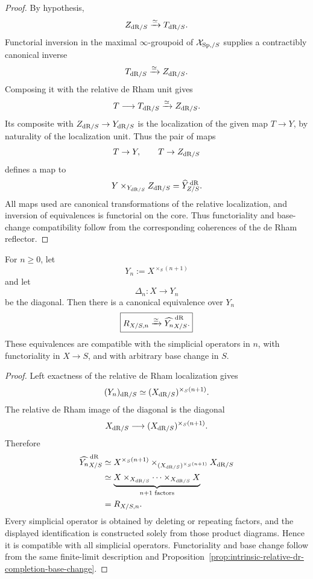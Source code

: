 \begin{proof}
By hypothesis,
\[
    Z_{\mathrm{dR}/S}\xrightarrow{\simeq}T_{\mathrm{dR}/S}.
\]
Functorial inversion in the maximal \(\infty\)-groupoid of
\(\mathcal X_{\mathrm{Sp},/S}\) supplies a contractibly canonical inverse
\[
    T_{\mathrm{dR}/S}\xrightarrow{\simeq}Z_{\mathrm{dR}/S}.
\]
Composing it with the relative de Rham unit gives
\[
    T\longrightarrow T_{\mathrm{dR}/S}
    \xrightarrow{\simeq}
    Z_{\mathrm{dR}/S}.
\]
Its composite with \(Z_{\mathrm{dR}/S}\to Y_{\mathrm{dR}/S}\) is the localization of the given map
\(T\to Y\), by naturality of the localization unit.  Thus the pair of maps
\[
    T\to Y,
    \qquad
    T\to Z_{\mathrm{dR}/S}
\]
defines a map to
\[
    Y\times_{Y_{\mathrm{dR}/S}}Z_{\mathrm{dR}/S}
    =
    \widehat Y^{\,\mathrm{dR}}_{Z/S}.
\]
All maps used are canonical transformations of the relative localization, and inversion of
equivalences is functorial on the core.  Thus functoriality and base-change compatibility follow from
the corresponding coherences of the de Rham reflector.
\end{proof}

\begin{theorem}
\label{thm:relation-simplices-as-completions}
For \(n\geq0\), let
\[
    Y_n:=X^{\times_S(n+1)}
\]
and let
\[
    \Delta_n:X\longrightarrow Y_n
\]
be the diagonal.  Then there is a canonical equivalence over \(Y_n\)
\[
\boxed{
    R_{X/S,n}
    \xrightarrow{\simeq}
    \widehat{Y_n}^{\,\mathrm{dR}}_{X/S}.
}
\]
These equivalences are compatible with the simplicial operators in \(n\), with functoriality in
\(X\to S\), and with arbitrary base change in \(S\).
\end{theorem}

\begin{proof}
Left exactness of the relative de Rham localization gives
\[
    (Y_n)_{\mathrm{dR}/S}
    \simeq
    (X_{\mathrm{dR}/S})^{\times_S(n+1)}.
\]
The relative de Rham image of the diagonal is the diagonal
\[
    X_{\mathrm{dR}/S}
    \longrightarrow
    (X_{\mathrm{dR}/S})^{\times_S(n+1)}.
\]
Therefore
\[
\begin{aligned}
    \widehat{Y_n}^{\,\mathrm{dR}}_{X/S}
    &\simeq
    X^{\times_S(n+1)}
    \times_{(X_{\mathrm{dR}/S})^{\times_S(n+1)}}
    X_{\mathrm{dR}/S}
    \\
    &\simeq
    \underbrace{
        X\times_{X_{\mathrm{dR}/S}}\cdots\times_{X_{\mathrm{dR}/S}}X
    }_{n+1\text{ factors}}
    \\
    &=R_{X/S,n}.
\end{aligned}
\]
Every simplicial operator is obtained by deleting or repeating factors, and the displayed
identification is constructed solely from those product diagrams.  Hence it is compatible with all
simplicial operators.  Functoriality and base change follow from the same finite-limit description
and Proposition~\ref{prop:intrinsic-relative-dr-completion-base-change}.
\end{proof}


